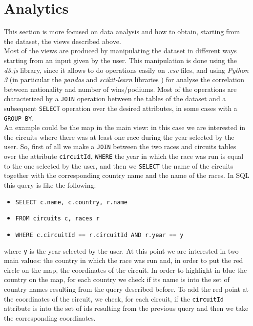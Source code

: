 \documentclass[11pt,twocolumn,letterpaper]{article}
\begin{document}
\section{Analytics}
This section is more focused on data analysis and how to obtain, starting from the dataset, the views described above.\\
Most of the views are produced by manipulating the dataset in different ways starting from an input given by the user. This manipulation is done using the \textit{d3.js} \cite{D3} library, since it allows to do operations easily on \textit{.csv} files, and using \textit{Python 3} (in particular the \textit{pandas} \cite{Pandas} and \textit{scikit-learn} libraries \cite{Scikit-learn}) for analyse the correlation between nationality and number of wins/podiums. Most of the operations are characterized by a \texttt{JOIN} operation between the tables of the dataset and a subsequent \texttt{SELECT} operation over the desired attributes, in some cases with a \texttt{GROUP BY}.\\
An example could be the map in the main view: in this case we are interested in the circuits where there was at least one race during the year selected by the user. So, first of all we make a \texttt{JOIN} between the two races and circuits tables over the attribute \texttt{circuitId}, \texttt{WHERE} the year in which the race was run is equal to the one selected by the user, and then we \texttt{SELECT} the name of the circuits together with the corresponding country name and the name of the races. In SQL this query is like the following:
\begin{itemize}
	\item \texttt{SELECT c.name, c.country, r.name}
	\item \texttt{FROM circuits c, races r}
	\item \texttt{WHERE c.circuitId == r.circuitId AND r.year == y}
\end{itemize}
where \texttt{y} is the year selected by the user.
At this point we are interested in two main values: the country in which the race was run and, in order to put the red circle on the map, the coordinates of the circuit. In order to highlight in blue the country on the map, for each country we check if its name is into the set of country names resulting from the query described before. To add the red point at the coordinates of the circuit, we check, for each circuit, if the \texttt{circuitId} attribute is into the set of ids resulting from the previous query and then we take the corresponding coordinates.\\
\end{document}
